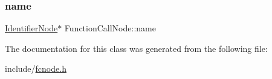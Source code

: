 \mbox{\label{classFunctionCallNode_a03ebfc10277d6c6a7698b5eb0c02ac73}} 
\subsubsection{\texorpdfstring{name}{name}}
{\footnotesize\ttfamily \hyperlink{classIdentifierNode}{Identifier\+Node}$\ast$ Function\+Call\+Node\+::name}



The documentation for this class was generated from the following file\+:\begin{DoxyCompactItemize}
\item 
include/\hyperlink{fcnode_8h}{fcnode.\+h}\end{DoxyCompactItemize}
